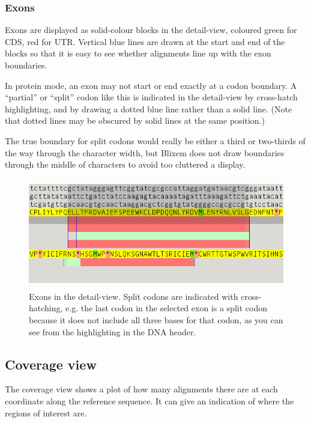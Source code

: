 \documentclass[letterpaper]{article}
\begin{document}
\bigskip

{\color[rgb]{0.30980393,0.5058824,0.7411765}\subsubsection[Exons]{Exons}}
{Exons are displayed as solid-colour blocks in the detail-view, coloured
green for CDS, red for UTR. Vertical blue lines are drawn at the
start and end of the blocks so that it is easy to see whether
alignments line up with the exon boundaries.}

\bigskip

{In protein mode, an exon may not start or end exactly at a codon
boundary. A {\textquotedblleft}partial{\textquotedblright} or
{\textquotedblleft}split{\textquotedblright} codon like this is
indicated in the detail-view by cross-hatch highlighting, and by
drawing a dotted blue line rather than a solid line. (Note that
dotted lines may be obscured by solid lines at the same position.)}

\bigskip

{The true boundary for split codons would really be either a third or
two-thirds of the way through the character width, but Blixem does not
draw boundaries through the middle of characters to avoid too cluttered
a display.}

\begin{figure}
\centering
\color[rgb]{0.30980393,0.5058824,0.7411765}
\includegraphics[width=12.321cm,height=4.801cm]{img_view_alignment_list_exons.png}
\caption{Exons in the detail-view.
Split codons are indicated with cross-hatching, e.g. the last codon in
the selected exon is a split codon because it does not include all
three bases for that codon, as you can see from the highlighting in the
DNA header.}
\end{figure}

\bigskip

{\color[rgb]{0.30980393,0.5058824,0.7411765}\subsection[Coverage view]{Coverage view}}
\hypertarget{RefHeading2953469222304}{}{
The coverage view shows a plot of how many alignments there are at each
coordinate along the reference sequence. It can give an indication of
where the regions of interest are.}
\end{document}
